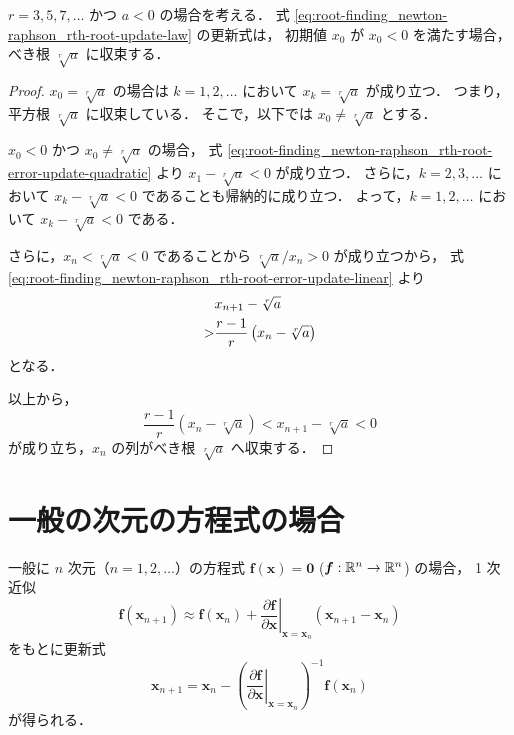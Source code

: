 \begin{theorem}
    $r = 3, 5, 7, \ldots$ かつ $a < 0$ の場合を考える．
    式 \eqref{eq:root-finding_newton-raphson_rth-root-update-law} の更新式は，
    初期値 $x_0$ が $x_0 < 0$ を満たす場合，
    べき根 $\sqrt[r]{a}$ に収束する．
\end{theorem}
\begin{proof}
    $x_0 = \sqrt[r]{a}$ の場合は
    $k = 1, 2, \ldots$ において $x_k = \sqrt[r]{a}$ が成り立つ．
    つまり，平方根 $\sqrt[r]{a}$ に収束している．
    そこで，以下では $x_0 \neq \sqrt[r]{a}$ とする．

    $x_0 < 0$ かつ $x_0 \neq \sqrt[r]{a}$ の場合，
    式 \eqref{eq:root-finding_newton-raphson_rth-root-error-update-quadratic} より
    $x_1 - \sqrt[r]{a} < 0$ が成り立つ．
    さらに，$k = 2, 3, \ldots$ において $x_k - \sqrt[r]{a} < 0$ であることも帰納的に成り立つ．
    よって，$k = 1, 2, \ldots$ において $x_k - \sqrt[r]{a} < 0$ である．

    さらに，$x_n < \sqrt[r]{a} < 0$ であることから
    $\sqrt[r]{a} / x_n > 0$ が成り立つから，
    式 \eqref{eq:root-finding_newton-raphson_rth-root-error-update-linear} より
    \begin{align}
          & x_{n+1} - \sqrt[r]{a}                          \notag \\
        > & \frac{r - 1}{r} \left(x_n - \sqrt[r]{a}\right)
    \end{align}
    となる．

    以上から，
    \begin{equation}
        \frac{r - 1}{r} \left(x_n - \sqrt[r]{a}\right) < x_{n+1} - \sqrt[r]{a} < 0
    \end{equation}
    が成り立ち，$x_n$ の列がべき根 $\sqrt[r]{a}$ へ収束する．
\end{proof}

\section{一般の次元の方程式の場合}

一般に $n$ 次元（$n=1,2,\ldots$）の方程式
$\bm{f}(\bm{x}) = \bm{0}$ ($\bm{f}: \mathbb{R}^n \to \mathbb{R}^n$) の場合，
1 次近似
\begin{equation}
    \bm{f}(\bm{x}_{n+1}) \approx
    \bm{f}(\bm{x}_n)
    + \left.\frac{\partial \bm{f}}{\partial \bm{x}}\right|_{\bm{x}=\bm{x}_n}
    (\bm{x}_{n+1} - \bm{x}_n)
\end{equation}
をもとに更新式
\begin{equation}
    \bm{x}_{n+1} = \bm{x}_n
    - \left( \left.\frac{\partial \bm{f}}{\partial \bm{x}}\right|_{\bm{x}=\bm{x}_n} \right)^{-1}
    \bm{f}(\bm{x}_n)
    \label{eq:root-finding_newton-raphson_n-dim-update-law}
\end{equation}
が得られる．

